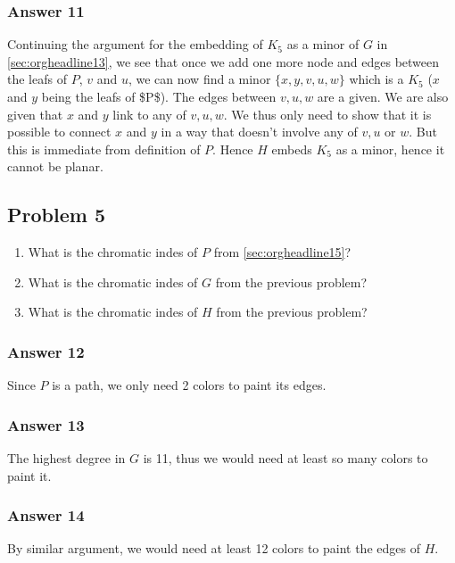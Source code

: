 \documentclass[11pt]{article}
\begin{document}
\subsubsection{Answer 11}
\label{sec:orgheadline14}
Continuing the argument for the embedding of \(K_{5}\) as a minor of \(G\) in
\ref{sec:orgheadline13}, we see that once we add one more node and edges between the leafs
of \(P\), \(v\) and \(u\), we can now find a minor \(\{x, y, v, u, w\}\) which is a
\(K_{5}\) (\(x\) and \(y\) being the leafs of \$P\$).  The edges between \(v, u, w\)
are a given.  We are also given that \(x\) and \(y\) link to any of \(v, u, w\).
We thus only need to show that it is possible to connect \(x\) and \(y\) in a way
that doesn't involve any of \(v, u\) or \(w\).  But this is immediate from
definition of \(P\).  Hence \(H\) embeds \(K_5\) as a minor, hence it cannot be
planar.

\subsection{Problem 5}
\label{sec:orgheadline19}
\begin{enumerate}
\item What is the chromatic indes of \(P\) from \ref{sec:orgheadline15}?
\item What is the chromatic indes of \(G\) from the previous problem?
\item What is the chromatic indes of \(H\) from the previous problem?
\end{enumerate}

\subsubsection{Answer 12}
\label{sec:orgheadline16}
Since \(P\) is a path, we only need 2 colors to paint its edges.

\subsubsection{Answer 13}
\label{sec:orgheadline17}
The highest degree in \(G\) is 11, thus we would need at least so many colors
to paint it.

\subsubsection{Answer 14}
\label{sec:orgheadline18}
By similar argument, we would need at least 12 colors to paint the edges of
\(H\).
\end{document}
